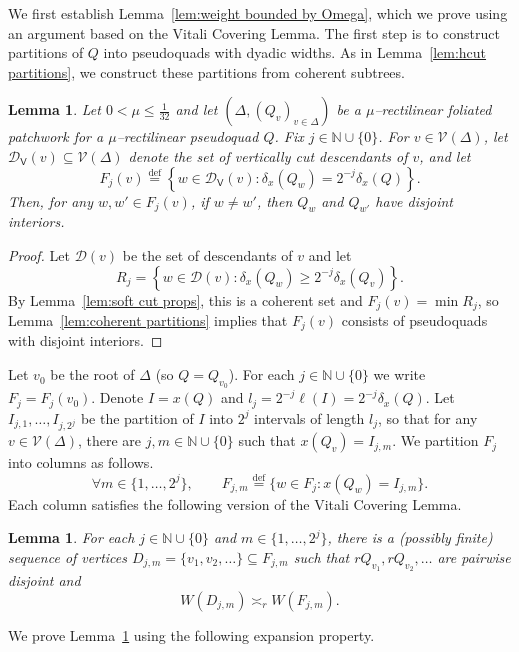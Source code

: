 \documentclass[11pt,reqno]{amsart}
\newcommand{\N}{\mathbb{N}}
\newcommand{\cD}{\mathcal{D}}
\newcommand{\cV}{\mathcal{V}}
\renewcommand{\approx}{\asymp}
\newcommand{\0}{\mathbf{0}}
\renewcommand{\1}{\mathbf 1}
\renewcommand{\mid}{:}
\renewcommand{\subset}{\subseteq}
\newcommand{\eqdef}{\stackrel{\mathrm{def}}{=}}
\renewcommand{\ge}{\geqslant}
\renewcommand{\le}{\leqslant}
\newtheorem{lemma}[thm]{Lemma}
\theoremstyle{remark}
\newcommand{\cDv}{{\mathcal{D}_{\mathsf{V}}}}
\begin{document}
We first establish Lemma~\ref{lem:weight bounded by Omega}, which we prove using an argument based on the Vitali Covering Lemma.  The first step is to construct partitions of $Q$ into pseudoquads with dyadic widths.  As in Lemma~\ref{lem:hcut partitions}, we construct these partitions from coherent subtrees.

\begin{lemma}\label{lem:vcut partitions}
  Let $0<\mu\le \frac{1}{32}$ and let $(\Delta,(Q_v)_{v\in \Delta})$ be a $\mu$--rectilinear foliated patchwork for a $\mu$--rectilinear pseudoquad $Q$. Fix $j\in \N\cup\{0\}$.  For $v\in \cV(\Delta)$, let $\cDv(v)\subset \cV(\Delta)$ denote the set of vertically cut descendants of $v$, and let
  $$F_j(v)\eqdef\left\{w\in \cDv(v)\mid \delta_x(Q_w)=2^{-j}\delta_x(Q) \right\}.$$
  Then, for any $w,w'\in F_j(v)$, if $w\ne w'$, then $Q_w$ and $Q_{w'}$ have disjoint interiors.
\end{lemma}
\begin{proof}
  Let $\cD(v)$ be the set of descendants of $v$ and let
  $$R_j=\left\{w\in \cD(v)\mid \delta_x(Q_w)\ge 2^{-j}\delta_x(Q_v) \right\}.$$
  By Lemma~\ref{lem:soft cut props}, this is a coherent set and $F_j(v)=\min R_j$, so Lemma~\ref{lem:coherent partitions} implies that $F_j(v)$ consists of pseudoquads with disjoint interiors.
\end{proof}

Let $v_0$ be the root of $\Delta$ (so $Q=Q_{v_0}$).  For each $j\in \N\cup \{0\}$ we write $F_j=F_j(v_0)$.  Denote $I=x(Q)$ and   $l_j=2^{-j}\ell(I)=2^{-j}\delta_x(Q)$. Let $I_{j,1},\dots, I_{j,2^j}$ be the partition of $I$ into $2^j$ intervals of length $l_j$, so that for any $v\in \cV(\Delta)$, there are $j,m\in \N\cup \{0\}$ such that $x(Q_v)=I_{j,m}$.  We partition $F_j$ into columns as follows.
\begin{equation}\label{eq:def Fjm}
\forall m\in \{1,\ldots, 2^j\},\qquad F_{j,m}\eqdef \{w\in F_j \mid x(Q_w)=I_{j,m}\}.
\end{equation}
Each column satisfies the following version of the Vitali Covering Lemma.
\begin{lemma}\label{lem:column coverings}
  For each $j\in \N\cup\{0\}$ and $m\in \{1,\ldots,2^j\}$, there is a (possibly finite) sequence of vertices $D_{j,m}=\{v_1,v_2,\ldots\}\subset  F_{j,m}$ such that  $rQ_{v_1},rQ_{v_2},\ldots$ are pairwise disjoint and
  $$W(D_{j,m})\approx_r W(F_{j,m}).$$
\end{lemma}

We prove Lemma~\ref{lem:column coverings} using the following expansion property.
\end{document}
